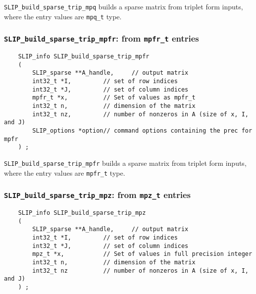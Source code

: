 \documentclass[12pt]{article}
\theoremstyle{definition}
\begin{document}
\verb|SLIP_build_sparse_trip_mpq| builds a sparse matrix from triplet form
inputs, where the entry values are \verb|mpq_t| type.

\cprotect\subsubsection{\verb|SLIP_build_sparse_trip_mpfr|:
from \verb|mpfr_t| entries}
\label{s:user:build_sparse_trip_mpfr}

\begin{mdframed}[userdefinedwidth=6in]
{\footnotesize
\begin{verbatim}
    SLIP_info SLIP_build_sparse_trip_mpfr
    (
        SLIP_sparse **A_handle,     // output matrix
        int32_t *I,         // set of row indices
        int32_t *J,         // set of column indices
        mpfr_t *x,          // Set of values as mpfr_t
        int32_t n,          // dimension of the matrix
        int32_t nz,         // number of nonzeros in A (size of x, I, and J)
        SLIP_options *option// command options containing the prec for mpfr
    ) ;
\end{verbatim}
} \end{mdframed}

\verb|SLIP_build_sparse_trip_mpfr| builds a sparse matrix from triplet form
inputs, where the entry values are \verb|mpfr_t| type.

\cprotect\subsubsection{\verb|SLIP_build_sparse_trip_mpz|:
from \verb|mpz_t| entries}
\label{s:user:build_sparse_trip_mpz}

\begin{mdframed}[userdefinedwidth=6in]
{\footnotesize
\begin{verbatim}
    SLIP_info SLIP_build_sparse_trip_mpz
    (
        SLIP_sparse **A_handle,     // output matrix
        int32_t *I,         // set of row indices
        int32_t *J,         // set of column indices
        mpz_t *x,           // Set of values in full precision integer
        int32_t n,          // dimension of the matrix
        int32_t nz          // number of nonzeros in A (size of x, I, and J)
    ) ;
\end{verbatim}
} \end{mdframed}
\end{document}
